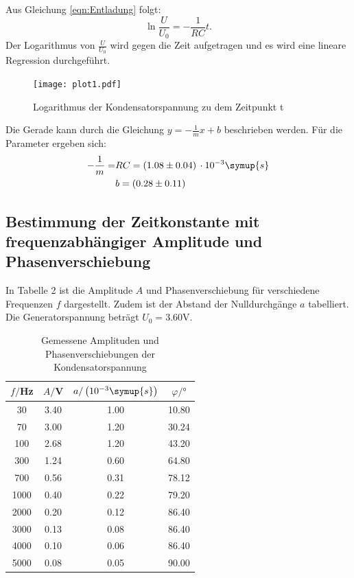 Aus Gleichung \eqref{eqn:Entladung} folgt:
\begin{equation}
  \ln{\frac{U}{U_0}} = -\frac{1}{RC}t.
\end{equation}
Der Logarithmus von $\frac{U}{U_0}$ wird gegen die Zeit aufgetragen und es wird eine lineare Regression durchgeführt.



\begin{figure}[H]
  \centering
  \texttt{[image: plot1.pdf]}
  \caption{Logarithmus der Kondensatorspannung zu dem Zeitpunkt t}
  \label{fig:entladung}
\end{figure}

Die Gerade kann durch die Gleichung $y = -\frac{1}{m}x + b$ beschrieben werden. Für die Parameter ergeben sich:
\begin{align*}
  -\frac{1}{m} = &RC = (1.08 \pm 0.04) \, \cdot 10^{-3} \symup{s} \\
  &b = (0.28 \pm 0.11)
\end{align*}

\subsection{Bestimmung der Zeitkonstante mit frequenzabhängiger Amplitude und Phasenverschiebung}

In Tabelle 2 ist die Amplitude $A$ und Phasenverschiebung für verschiedene Frequenzen $f$ dargestellt. Zudem ist der
Abstand der Nulldurchgänge $a$ tabelliert. Die Generatorspannung beträgt $U_0 = 3.60$V.

\begin{table}[H]
  \centering
  \caption{Gemessene Amplituden und Phasenverschiebungen der Kondensatorspannung}
  \label{tab:amplitude}
  \begin{tabular}{c c c c}
    \toprule
    $f/$Hz & $A/$V & $a/\left(10^{-3}\symup{s}\right)$ & $\varphi /°$ \\
    \midrule
    30   &  3.40 &    1.00 &  10.80 \\
    70   &  3.00 &    1.20 &  30.24 \\
    100  &  2.68 &    1.20 &  43.20 \\
    300  &  1.24 &    0.60 &  64.80 \\
    700  &  0.56 &    0.31 &  78.12 \\
    1000 &  0.40 &    0.22 &  79.20 \\
    2000 &  0.20 &    0.12 &  86.40 \\
    3000 &  0.13 &    0.08 &  86.40 \\
    4000 &  0.10 &    0.06 &  86.40 \\
    5000 &  0.08 &    0.05 &  90.00 \\
    \bottomrule
  \end{tabular}
\end{table}

